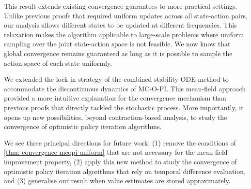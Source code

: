 This result extends existing convergence guarantees to more practical settings. Unlike previous proofs that required uniform updates across all state-action pairs, our analysis allows different states to be updated at different frequencies.
This relaxation makes the algorithm applicable to large-scale problems where uniform sampling over the joint state-action space is not feasible.
We now know that global convergence remains guaranteed as long as it is possible to sample the action space of each state uniformly.


We extended the lock-in strategy of the combined stability-ODE method to accommodate the discontinuous dynamics of MC-O-PI.
This mean-field approach provided a more intuitive explanation for the convergence mechanism than previous proofs that directly tackled the stochastic process.
More importantly, it opens up new possibilities, beyond contraction-based analysis, to study the convergence of optimistic policy iteration algorithms.


We see three principal directions for future work:
(1) remove the conditions of \autoref{thm: convergence mcopi uniform} that are not necessary for the mean-field improvement property,
(2) apply this new method to study the convergence of optimistic policy iteration algorithms that rely on temporal difference evaluation,
and (3) generalise our result when value estimates are stored approximately.






